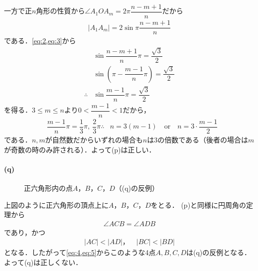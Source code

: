 \documentclass[../../main.tex]{subfiles}
\begin{document}
一方で正$n$角形の性質から$\angle A_1OA_m=2\pi\dfrac{n-m+1}{n}$だから
\begin{align}
  |A_1A_m|=2\sin\pi\dfrac{n-m+1}{n} \label{eq:3}
\end{align}
である．\cref{eq:2,eq:3}から
\begin{align}
  & \sin\dfrac{n-m+1}{n}\pi=\dfrac{\sqrt{3}}{2}\\
  & \sin\left(\pi-\dfrac{m-1}{n}\pi\right)=\dfrac{\sqrt{3}}{2}\\
  \therefore
  & \sin\dfrac{m-1}{n}\pi=\dfrac{\sqrt{3}}{2}
\end{align}
を得る．$3\le m\le n$より$0<\dfrac{m-1}{n}<1$だから，
\begin{align}
  & \dfrac{m-1}{n}\pi=\dfrac{1}{3}\pi,\ \dfrac{2}{3}\pi
  \therefore
  & n=3(m-1)\quad\text{or}\quad n=3\cdot\dfrac{m-1}{2}
\end{align}
である．$n,m$が自然数だからいずれの場合も$n$は$3$の倍数である（後者の場合は$m$が奇数の時のみ許される）．よって(p)は正しい．

\paragraph{(q)}

\begin{figure}[H]
  \centering
  \caption{正六角形内の点$A$，$B$，$C$，$D$（(q)の反例）}
\end{figure}

上図のように正六角形の頂点上に$A$，$B$，$C$，$D$をとる．
(p)と同様に円周角の定理から
\begin{align}
  \angle ACB=\angle ADB \label{eq:4}
\end{align}
であり，かつ
\begin{align}
  |AC|<|AD|，\quad|BC|<|BD| \label{eq:5}
\end{align}
となる．したがって\cref{eq:4,eq:5}からこのような4点$A,B,C,D$は(q)の反例となる．よって(q)は正しくない．

\newpage
\end{document}
